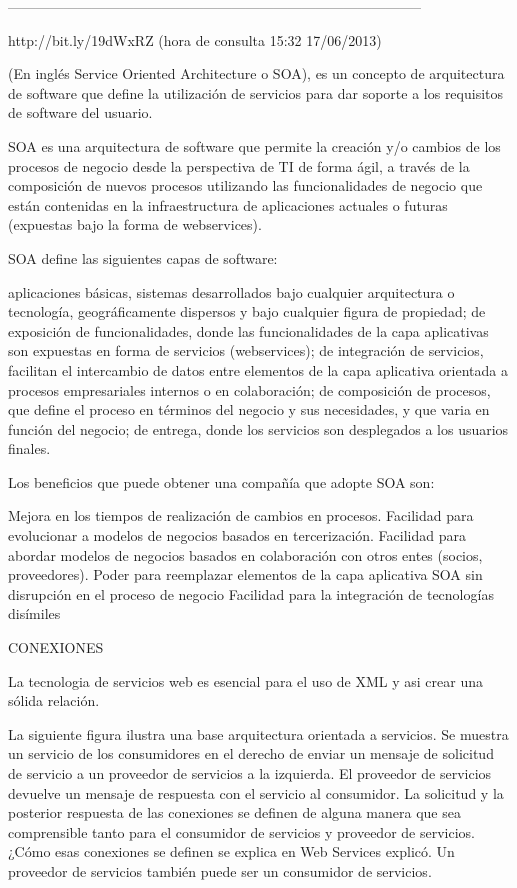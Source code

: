-----------------------------------------------------------------------------------------

http://bit.ly/19dWxRZ (hora de consulta 15:32 17/06/2013)


(En inglés Service Oriented Architecture o SOA), es un concepto de arquitectura de software que define la utilización de 
servicios para dar soporte a los requisitos de software del usuario.

SOA es una arquitectura de software que permite la creación y/o cambios de los procesos de negocio desde la perspectiva 
de TI de forma ágil, a través de la composición de nuevos procesos utilizando las funcionalidades de negocio que están 
contenidas en la infraestructura de aplicaciones actuales o futuras (expuestas bajo la forma de webservices).

SOA define las siguientes capas de software:

    aplicaciones básicas, sistemas desarrollados bajo cualquier arquitectura o tecnología, geográficamente dispersos y bajo 
     cualquier figura de propiedad;
    de exposición de funcionalidades, donde las funcionalidades de la capa aplicativas son expuestas en forma de servicios (webservices);
    de integración de servicios, facilitan el intercambio de datos entre elementos de la capa aplicativa orientada a procesos 
     empresariales internos o en colaboración;
    de composición de procesos, que define el proceso en términos del negocio y sus necesidades, y que varia en función del negocio;
    de entrega, donde los servicios son desplegados a los usuarios finales.

Los beneficios que puede obtener una compañía que adopte SOA son:

    Mejora en los tiempos de realización de cambios en procesos.
    Facilidad para evolucionar a modelos de negocios basados en tercerización.
    Facilidad para abordar modelos de negocios basados en colaboración con otros entes (socios, proveedores).
    Poder para reemplazar elementos de la capa aplicativa SOA sin disrupción en el proceso de negocio
    Facilidad para la integración de tecnologías disímiles

CONEXIONES

La tecnologia de servicios web es esencial para el uso de XML y asi crear una sólida relación.

La siguiente figura ilustra una base arquitectura orientada a servicios. Se muestra un servicio de los consumidores en el derecho de 
enviar un mensaje de solicitud de servicio a un proveedor de servicios a la izquierda. El proveedor de servicios devuelve un mensaje 
de respuesta con el servicio al consumidor. La solicitud y la posterior respuesta de las conexiones se definen de alguna manera que 
sea comprensible tanto para el consumidor de servicios y proveedor de servicios. ¿Cómo esas conexiones se definen se explica en Web 
Services explicó. Un proveedor de servicios también puede ser un consumidor de servicios.

